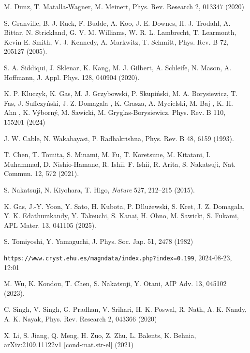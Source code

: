 \documentclass[prb,showpacs,amsmath,amssymb,superscriptaddress,twocolumn,floatfix]{revtex4-1}
\begin{document}
\begin{thebibliography}{99}
 M. Dunz, T. Matalla-Wagner, M. Meinert, Phys. Rev. Research 2, 013347 (2020) %

 S. Granville, B. J. Ruck, F. Budde, A. Koo, J. E. Downes, H. J. Trodahl, A. Bittar, N. Strickland, G. V. M. Williams, W. R. L. Lambrecht, T. Learmonth, Kevin E. Smith, V. J. Kennedy, A. Markwitz, T. Schmitt, Phys. Rev. B 72, 205127 (2005). %

 S. A. Siddiqui, J. Sklenar, K. Kang, M. J. Gilbert, A. Schleife, N. Mason, A. Hoffmann, J. Appl. Phys. 128, 040904 (2020). %

 K. P. Kluczyk, K. Gas, M. J. Grzybowski, P. Skupi\'nski, M. A. Borysiewicz, T. Fas, J. Suffczy\'nski, J. Z. Domagala , K. Grasza, A. Mycielski, M. Baj , K. H. Ahn , K. V\'yborn\'y, M. Sawicki, M. Gryglas-Borysiewicz, Phys. Rev. B 110, 155201 (2024)

 J. W. Cable, N. Wakabayasi, P. Radhakrishna, Phys. Rev. B 48, 6159 (1993). %

 T. Chen, T. Tomita, S. Minami, M. Fu, T. Koretsune, M. Kitatani, I. Muhammad, D. Nishio-Hamane, R. Ishii, F. Ishii, R. Arita, S. Nakatsuji, Nat. Commun. 12, 572 (2021). %

 S. Nakatsuji, N. Kiyohara, T. Higo, \textit{Nature} 527, 212–215 (2015). %


 K. Gas, J.-Y. Yoon, Y. Sato, H. Kubota, P. D\l{l}u\.{z}ewski, S. Kret, J. Z. Domagala, Y. K. Edathumkandy, Y. Takeuchi, S. Kanai, H. Ohno, M. Sawicki, S. Fukami, APL Mater. 13, 041105 (2025). %


 S. Tomiyoshi, Y. Yamaguchi, J. Phys. Soc. Jap. 51, 2478 (1982)

\texttt{https://www.cryst.ehu.es/magndata/index.php?index=0.199}, 2024-08-23, 12:01

 M. Wu, K. Kondou, T. Chen, S. Nakatsuji, Y. Otani, AIP Adv. 13, 045102 (2023). %

 C. Singh, V. Singh, G. Pradhan, V. Srihari, H. K. Poswal, R. Nath, A. K. Nandy, A. K. Nayak, Phys. Rev. Research 2, 043366 (2020) %

 X. Li, S. Jiang, Q. Meng, H. Zuo, Z. Zhu, L. Balents, K. Behnia, arXiv:2109.11122v1 [cond-mat.str-el] (2021)


\end{thebibliography}
\end{document}

